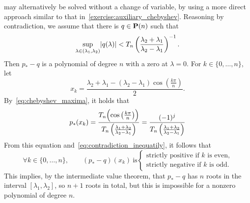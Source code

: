 \begin{solution}
     may alternatively be solved without a change of variable,
    by using a more direct approach similar to that in~\cref{exercise:auxiliary_chebyshev}.
    Reasoning by contradiction,
    we assume that there is $q \in \mathbf P(n)$ such that
    \begin{equation}
        \label{eq:contradiction_inequatily}
        \sup_{\lambda \in (\lambda_1, \lambda_2)} \lvert q(\lambda)\rvert
        <  T_{n}\left(\frac{\lambda_2 + \lambda_1}{\lambda_2 - \lambda_1}\right) ^{-1}.
    \end{equation}
    Then $p_* - q$ is a polynomial of degree $n$
    with a zero at $\lambda = 0$.
    For $k \in \{0, \dotsc, n\}$, let
    \[
        x_k = \frac{\lambda_2 + \lambda_1 - (\lambda_2 - \lambda_1) \cos \left(\frac{k \pi}{n} \right)}{2}.
    \]
    By~\eqref{eq:chebyshev_maxima},
    it holds that
    \[
        p_*(x_k) = \frac{T_n \Bigl(\cos\left(\frac{k\pi}{n}\right) \Bigr)}{T_n \left(\frac{\lambda_1 + \lambda_2}{\lambda_2 - \lambda_1} \right)}
        = \frac{(-1)^j}{T_n \left(\frac{\lambda_1 + \lambda_2}{\lambda_2 - \lambda_1} \right)}
    \]
    From this equation and~\eqref{eq:contradiction_inequatily},
    it follows that
    \[
        \forall k \in \{0, \dotsc, n\}, \qquad
        (p_* - q)(x_k)~\text{is}
        \begin{cases}
            \text{strictly positive if $k$ is even,} \\
            \text{strictly negative if $k$ is odd.}
        \end{cases}
    \]
    This implies, by the intermediate value theorem,
    that $p_* - q$ has $n$ roots in the interval $[\lambda_1, \lambda_2]$,
    so $n+1$ roots in total,
    but this is impossible for a nonzero polynomial of degree $n$.
\end{solution}
